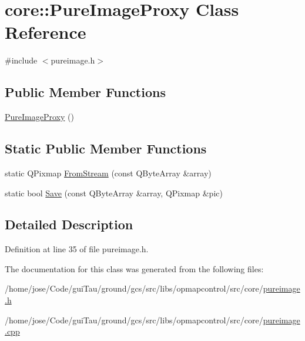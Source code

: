 \hypertarget{classcore_1_1_pure_image_proxy}{\section{core\-:\-:Pure\-Image\-Proxy Class Reference}
\label{classcore_1_1_pure_image_proxy}
}


{\ttfamily \#include $<$pureimage.\-h$>$}

\subsection*{Public Member Functions}
\begin{DoxyCompactItemize}
\item 
\hyperlink{group___o_p_map_widget_ga6c0425d3ca7f1f64fcfa477e419df111}{Pure\-Image\-Proxy} ()
\end{DoxyCompactItemize}
\subsection*{Static Public Member Functions}
\begin{DoxyCompactItemize}
\item 
static Q\-Pixmap \hyperlink{group___o_p_map_widget_gaadda67144242dbc72eecd8bf5e4ad935}{From\-Stream} (const Q\-Byte\-Array \&array)
\item 
static bool \hyperlink{group___o_p_map_widget_ga90956060e74b0bed45a12b6b99995c82}{Save} (const Q\-Byte\-Array \&array, Q\-Pixmap \&pic)
\end{DoxyCompactItemize}


\subsection{Detailed Description}


Definition at line 35 of file pureimage.\-h.



The documentation for this class was generated from the following files\-:\begin{DoxyCompactItemize}
\item 
/home/jose/\-Code/gui\-Tau/ground/gcs/src/libs/opmapcontrol/src/core/\hyperlink{pureimage_8h}{pureimage.\-h}\item 
/home/jose/\-Code/gui\-Tau/ground/gcs/src/libs/opmapcontrol/src/core/\hyperlink{pureimage_8cpp}{pureimage.\-cpp}\end{DoxyCompactItemize}
